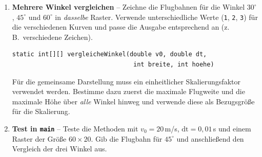 \documentclass[
	fontsize=12pt,          %
	paper=a4,               %
	numbers=noenddot,       %
	listof=totoc,           %
	listof=entryprefix,     %
	listof=nochaptergap,    %
	bibliography=totoc,     %
	parskip=half            %
	openany                 %
]{scrbook}
\begin{document}
\begin{enumerate}[label=\textbf{\alph*)}]
\begin{beispiel}[{Mögliche Ausgabe ($v_0 = 20$, $\alpha = 45^\circ$, Raster $60 \times 20$)}]
\begin{verbatim}
  *                                   *

 *                                     *

*                                       *
\end{verbatim}
\end{beispiel}

\item \textbf{Mehrere Winkel vergleichen} -- Zeichne die Flugbahnen für die Winkel $30^\circ$, $45^\circ$ und $60^\circ$ in \emph{dasselbe} Raster. Verwende unterschiedliche Werte (\texttt{1}, \texttt{2}, \texttt{3}) für die verschiedenen Kurven und passe die Ausgabe entsprechend an (z.\,B.\ verschiedene Zeichen).

\begin{lstlisting}
static int[][] vergleicheWinkel(double v0, double dt,
                                 int breite, int hoehe)
\end{lstlisting}

\begin{hinweis}
	Für die gemeinsame Darstellung muss ein einheitlicher Skalierungsfaktor verwendet werden. Bestimme dazu zuerst die maximale Flugweite und die maximale Höhe über \emph{alle} Winkel hinweg und verwende diese als Bezugsgröße für die Skalierung.
\end{hinweis}

\item \textbf{Test in \texttt{main}} -- Teste die Methoden mit $v_0 = 20$\,m/s, $\text{dt} = 0{,}01$\,s und einem Raster der Größe $60 \times 20$. Gib die Flugbahn für $45^\circ$ und anschließend den Vergleich der drei Winkel aus.

\end{enumerate}
\end{document}
